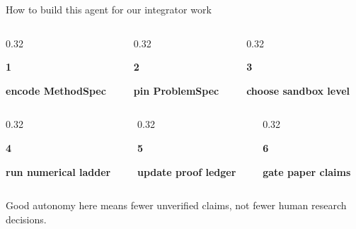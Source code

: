 \documentclass[aspectratio=169,10pt]{beamer}
\newcommand{\panel}[2]{%
  \begingroup
  \setlength{\fboxsep}{0.16cm}%
  \colorbox{LightBG}{\begin{minipage}{#1}#2\end{minipage}}%
  \endgroup
}
\newcommand{\colorpanel}[3]{%
  \begingroup
  \setlength{\fboxsep}{0.16cm}%
  \colorbox{#1}{\begin{minipage}{#2}#3\end{minipage}}%
  \endgroup
}
\newcommand{\badge}[2]{\colorbox{#1}{\strut\hspace{0.35em}\color{white}\bfseries #2\hspace{0.35em}}}
\begin{document}
\begin{frame}{How to build this agent for our integrator work}
  \begin{columns}[T,onlytextwidth]
    \begin{column}{0.32\textwidth}
      \panel{\linewidth}{\badge{UWRed}{1}\quad\bfseries encode MethodSpec}
    \end{column}
    \begin{column}{0.32\textwidth}
      \panel{\linewidth}{\badge{BlueAccent}{2}\quad\bfseries pin ProblemSpec}
    \end{column}
    \begin{column}{0.32\textwidth}
      \panel{\linewidth}{\badge{GreenAccent}{3}\quad\bfseries choose sandbox level}
    \end{column}
  \end{columns}

  \vspace{0.45cm}
  \begin{columns}[T,onlytextwidth]
    \begin{column}{0.32\textwidth}
      \panel{\linewidth}{\badge{OrangeAccent}{4}\quad\bfseries run numerical ladder}
    \end{column}
    \begin{column}{0.32\textwidth}
      \panel{\linewidth}{\badge{DarkText}{5}\quad\bfseries update proof ledger}
    \end{column}
    \begin{column}{0.32\textwidth}
      \panel{\linewidth}{\badge{UWRed}{6}\quad\bfseries gate paper claims}
    \end{column}
  \end{columns}

  \vspace{0.75cm}
  \colorpanel{LightBG}{0.88\linewidth}{\centering
  Good autonomy here means fewer unverified claims, not fewer human research decisions.}
\end{frame}
\end{document}
